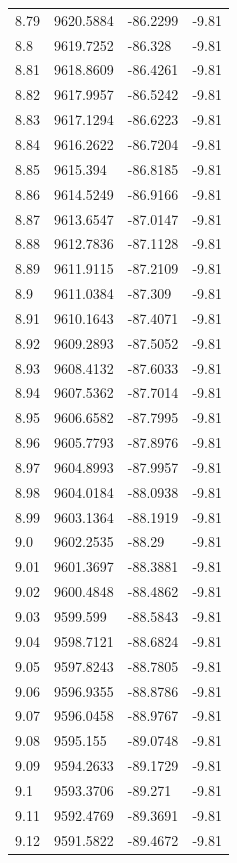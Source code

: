 \begin{table}[H]
\begin{tabular}{llll}
8.79 & 9620.5884 & -86.2299 & -9.81 \\
8.8 & 9619.7252 & -86.328 & -9.81 \\
8.81 & 9618.8609 & -86.4261 & -9.81 \\
8.82 & 9617.9957 & -86.5242 & -9.81 \\
8.83 & 9617.1294 & -86.6223 & -9.81 \\
8.84 & 9616.2622 & -86.7204 & -9.81 \\
8.85 & 9615.394 & -86.8185 & -9.81 \\
8.86 & 9614.5249 & -86.9166 & -9.81 \\
8.87 & 9613.6547 & -87.0147 & -9.81 \\
8.88 & 9612.7836 & -87.1128 & -9.81 \\
8.89 & 9611.9115 & -87.2109 & -9.81 \\
8.9 & 9611.0384 & -87.309 & -9.81 \\
8.91 & 9610.1643 & -87.4071 & -9.81 \\
8.92 & 9609.2893 & -87.5052 & -9.81 \\
8.93 & 9608.4132 & -87.6033 & -9.81 \\
8.94 & 9607.5362 & -87.7014 & -9.81 \\
8.95 & 9606.6582 & -87.7995 & -9.81 \\
8.96 & 9605.7793 & -87.8976 & -9.81 \\
8.97 & 9604.8993 & -87.9957 & -9.81 \\
8.98 & 9604.0184 & -88.0938 & -9.81 \\
8.99 & 9603.1364 & -88.1919 & -9.81 \\
9.0 & 9602.2535 & -88.29 & -9.81 \\
9.01 & 9601.3697 & -88.3881 & -9.81 \\
9.02 & 9600.4848 & -88.4862 & -9.81 \\
9.03 & 9599.599 & -88.5843 & -9.81 \\
9.04 & 9598.7121 & -88.6824 & -9.81 \\
9.05 & 9597.8243 & -88.7805 & -9.81 \\
9.06 & 9596.9355 & -88.8786 & -9.81 \\
9.07 & 9596.0458 & -88.9767 & -9.81 \\
9.08 & 9595.155 & -89.0748 & -9.81 \\
9.09 & 9594.2633 & -89.1729 & -9.81 \\
9.1 & 9593.3706 & -89.271 & -9.81 \\
9.11 & 9592.4769 & -89.3691 & -9.81 \\
9.12 & 9591.5822 & -89.4672 & -9.81 \\

\end{tabular}
\end{table}
